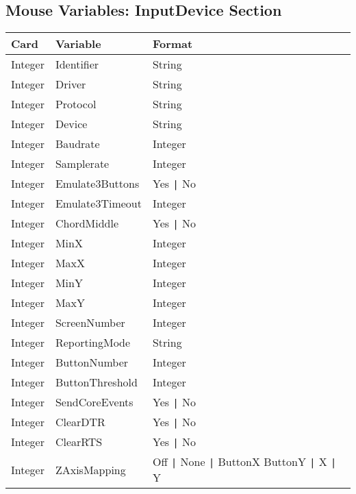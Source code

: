 \subsection{Mouse Variables: InputDevice Section}
\begin{tabular}[h]{|p{2cm}|p{4cm}|p{7cm}|}
 \hline
 \textbf{Card} & \textbf{Variable}     & \textbf{Format}        \\
 \hline
 Integer & Identifier       & String                             \\
 Integer & Driver           & String                             \\
 Integer & Protocol         & String                             \\
 Integer & Device           & String                             \\
 Integer & Baudrate         & Integer                            \\
 Integer & Samplerate       & Integer                            \\
 Integer & Emulate3Buttons  & Yes \verb+|+ No                    \\
 Integer & Emulate3Timeout  & Integer                            \\
 Integer & ChordMiddle      & Yes \verb+|+ No                    \\
 Integer & MinX             & Integer                            \\
 Integer & MaxX             & Integer                            \\
 Integer & MinY             & Integer                            \\
 Integer & MaxY             & Integer                            \\
 Integer & ScreenNumber     & Integer                            \\
 Integer & ReportingMode    & String                             \\
 Integer & ButtonNumber     & Integer                            \\
 Integer & ButtonThreshold  & Integer                            \\
 Integer & SendCoreEvents   & Yes \verb+|+ No                    \\
 Integer & ClearDTR         & Yes \verb+|+ No                    \\
 Integer & ClearRTS         & Yes \verb+|+ No                    \\
 Integer & ZAxisMapping     & Off \verb+|+ None \verb+|+ ButtonX ButtonY \verb+|+ X \verb+|+ Y \\

\end{tabular}
